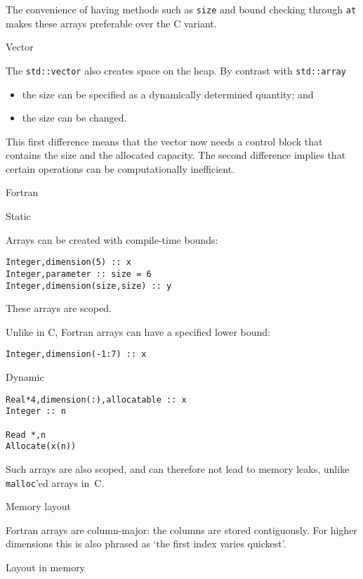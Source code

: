 The convenience of having methods such as \lstinline{size}
and bound checking through \lstinline{at}
makes these arrays preferable over the C variant.

 {Vector}
\label{sec:cpp-std-vector}

The \lstinline+std::vector+ also creates space on the heap.
By contrast with \lstinline+std::array+
\begin{itemize}
\item the size can be specified as a dynamically determined quantity; and
\item the size can be changed.
\end{itemize}
This first difference means that the vector now needs a control block that
contains the size and the allocated capacity.
The second difference implies that certain operations can be
computationally inefficient.

 {Fortran}

 {Static}

\lstset{language=Fortran}

Arrays can be created with compile-time bounds:
\begin{lstlisting}
Integer,dimension(5) :: x
Integer,parameter :: size = 6
Integer,dimension(size,size) :: y
\end{lstlisting}

These arrays are scoped.

Unlike in C, Fortran arrays can have a specified lower bound:
\begin{lstlisting}
Integer,dimension(-1:7) :: x
\end{lstlisting}

 {Dynamic}

\begin{lstlisting}
Real*4,dimension(:),allocatable :: x
Integer :: n

Read *,n
Allocate(x(n))
\end{lstlisting}

Such arrays are also scoped,
and can therefore not lead to memory leaks,
unlike \lstinline{malloc}'ed arrays in~C.

 {Memory layout}

Fortran arrays are column-major:
the columns are stored contiguously.
For higher dimensions this is also phrased as
`the first index varies quickest'.

 {Layout in memory}
\label{sec:CFarrays}

